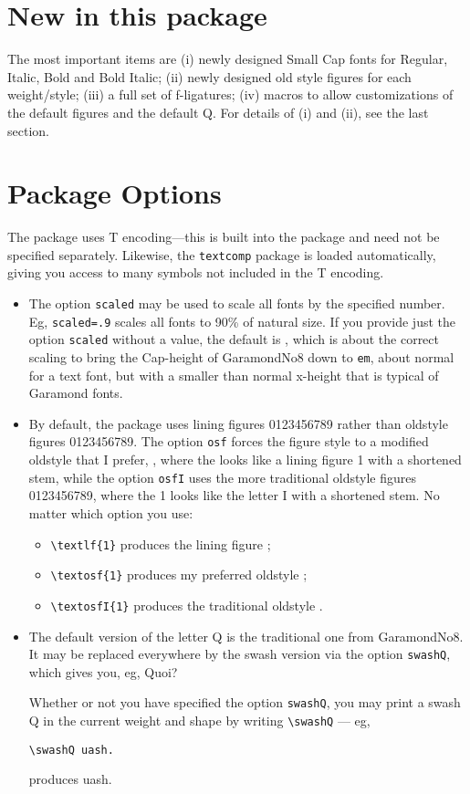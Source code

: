 \documentclass[11pt]{article}
\begin{document}
\section{New in this package}
The most important items are (i) newly designed Small Cap fonts for Regular, Italic, Bold and Bold Italic; (ii) newly designed old style figures for each weight/style; (iii) a full set of f-ligatures; (iv) macros to allow customizations of the default figures and the default Q. For details of (i) and (ii), see the last section.
\section{Package Options}
The package uses T encoding---this is built into the package and need not be specified separately. Likewise, the \texttt{textcomp} package is loaded automatically, giving you access to many symbols not included in the T encoding.
\begin{itemize}
\item
The option \texttt{scaled} may be used to scale all fonts by the specified number. Eg, \texttt{scaled=.9} scales all fonts to 90\% of natural size. If you provide just the option \texttt{scaled} without a value, the default is , which is about the correct scaling to bring the Cap-height of GaramondNo8 down to \texttt{em}, about normal for a text font, but with a  smaller than normal  x-height that is typical of Garamond fonts.
\item
By default, the package uses lining figures { 0123456789} rather than oldstyle figures 0123456789. The option \texttt{osf} forces the figure style to a modified oldstyle that I prefer, , where the  looks like a lining figure { 1} with a shortened stem, while the option \texttt{osfI} uses the more traditional oldstyle figures 0123456789, where the 1 looks like the letter I with a shortened stem. No matter which option you use:
\begin{itemize}
\item
\verb|\textlf{1}| produces the lining figure ;
\item \verb|\textosf{1}| produces my preferred oldstyle ;
\item \verb|\textosfI{1}| produces the traditional oldstyle .
\end{itemize}
\item The default version of the letter Q is the traditional one from GaramondNo8. It may be replaced everywhere by the swash version via the option \texttt{swashQ}, which gives you, eg, 
{\sq Q}uoi?

Whether or not you have specified the option \texttt{swashQ}, you may print a swash Q in the current weight and shape by writing \verb|\swashQ| --- eg, 
\begin{verbatim}
\swashQ uash.
\end{verbatim}
produces \swashQ uash.
\end{itemize}
\end{document}
